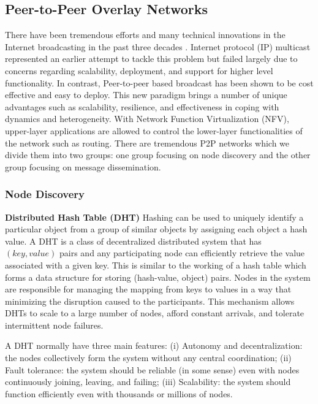 \subsection{Peer-to-Peer Overlay Networks}

There have been tremendous efforts and many technical innovations in the Internet broadcasting in the past three decades \cite{liu2008opportunities}. Internet protocol (IP) multicast represented an earlier attempt to tackle this problem but failed largely due to concerns regarding scalability, deployment, and support for higher level functionality. In contrast, Peer-to-peer based broadcast has been shown to be cost effective and easy to deploy. This new paradigm brings a number of unique advantages such as scalability, resilience, and effectiveness in coping with dynamics and heterogeneity. With Network Function Virtualization (NFV), upper-layer applications are allowed to control the lower-layer functionalities of the network such as routing. There are tremendous P2P networks which we divide them into two groups: one group focusing on node discovery and the other group focusing on message dissemination.

\subsubsection{Node Discovery}

\textbf{Distributed Hash Table (DHT)} Hashing can be used to uniquely identify a particular object from a group of similar objects by assigning each object a hash value. A DHT \cite{galuba2009distributed} is a class of decentralized distributed system that has $(key, value)$ pairs and any participating node can efficiently retrieve the value associated with a given key. This is similar to the working of a hash table which forms a data structure for storing (hash-value, object) pairs. Nodes in the system are responsible for managing the mapping from keys to values in a way that minimizing the disruption caused to the participants. This mechanism allows DHTs to scale to a large number of nodes, afford constant arrivals, and tolerate intermittent node failures.

A DHT normally have three main features: (i) Autonomy and decentralization: the nodes collectively form the system without any central coordination; (ii) Fault tolerance: the system should be reliable (in some sense) even with nodes continuously joining, leaving, and failing; (iii) Scalability: the system should function efficiently even with thousands or millions of nodes.

